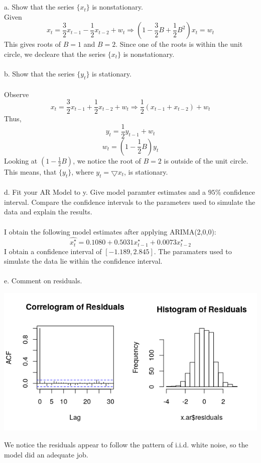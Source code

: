 \documentclass[11pt]{article}
\begin{document}
\section{}
a. Show that the series $\{x_t\}$ is nonstationary.\\
Given $$ x_t = \frac{3}{2}x_{t-1} - \frac{1}{2}x_{t-2} + w_t \Rightarrow (1 - \frac{3}{2}B + \frac{1}{2}B^2)x_t = w_t $$
This gives roots of $B = 1$ and $B = 2$. Since one of the roots is within the unit circle, we decleare that the series $\{x_t\}$ is nonstationary.
\\\\
b. Show that the series $\{y_t\}$ is stationary.
\\\\
Observe
$$ x_t = \frac{3}{2}x_{t-1} + \frac{1}{2}x_{t-2} + w_t \Rightarrow \frac{1}{2}(x_{t-1} + x_{t-2}) + w_t $$
Thus,
$$ y_t = \frac{1}{2}y_{t-1} + w_t $$
$$ w_t = (1-\frac{1}{2}B)y_t $$
Looking at $(1-\frac{1}{2}B)$, we notice the root of $B=2$ is outside of the unit circle. This means, that $\{y_t\}$, where $y_t = \bigtriangledown x_t$, is stationary.
\\\\
d. Fit your AR Model to y. Give model paramter estimates and a $95\%$ confidence interval. Compare the confidence intervals to the parameters used to simulate the data and explain the results.
\\\\
I obtain the following model estimates after applying ARIMA(2,0,0):
$$ \hat{x_t^\star} = 0.1080 + 0.5031x_{t-1}^\star + 0.0073x_{t-2}^\star $$
I obtain a confidence interval of $[-1.189,2.845]$. The paramaters used to simulate the data lie within the confidence interval.
\\\\
e. Comment on residuals.\\
\begin{center}
\includegraphics[scale=1]{3e}
\end{center}
We notice the residuals appear to follow the pattern of i.i.d. white noise, so the model did an adequate job.
\end{document}
